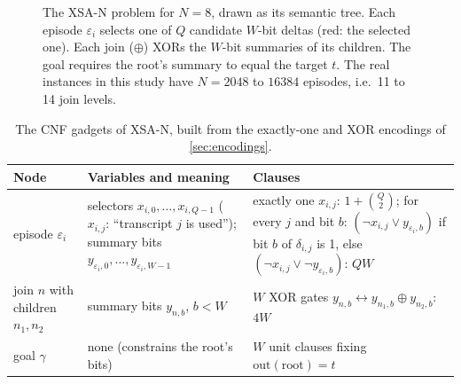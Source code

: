 \documentclass[11pt,a4paper]{article}
\newcommand{\XSA}{\textsf{XSA-N}}
\newcommand{\outb}{\mathrm{out}}
\begin{document}
\begin{figure}[htbp]
\centering
{}
\caption{The \XSA{} problem for $N=8$, drawn as its semantic tree. Each episode $\varepsilon_i$
selects one of $Q$ candidate $W$-bit deltas (red: the selected one). Each join ($\oplus$)
XORs the $W$-bit summaries of its children. The goal requires the root's summary to equal
the target $t$. The real instances in this study have $N=2048$ to $16384$ episodes, i.e.\
11 to 14 join levels.}
\label{fig:xsa}
\end{figure}

\begin{table}[htbp]
\centering\small
\begin{tabular}{@{}p{}p{}p{}@{}}
\toprule
Node & Variables and meaning & Clauses \\
\midrule
episode $\varepsilon_i$ & selectors $x_{i,0},\dots,x_{i,Q-1}$ ($x_{i,j}$: ``transcript $j$ is used'');
  summary bits $y_{\varepsilon_i,0},\dots,y_{\varepsilon_i,W-1}$ &
  exactly one $x_{i,j}$: $1+\binom{Q}{2}$; for every $j$ and bit $b$: $(\neg x_{i,j}\lor y_{\varepsilon_i,b})$ if bit $b$ of $\delta_{i,j}$ is 1, else $(\neg x_{i,j}\lor\neg y_{\varepsilon_i,b})$: $QW$ \\
join $n$ with children $n_1,n_2$ & summary bits $y_{n,b}$, $b<W$ &
  $W$ XOR gates $y_{n,b}\leftrightarrow y_{n_1,b}\oplus y_{n_2,b}$: $4W$ \\
goal $\gamma$ & none (constrains the root's bits) & $W$ unit clauses fixing $\outb(\text{root})=t$ \\
\bottomrule
\end{tabular}
\caption{The CNF gadgets of \XSA{}, built from the exactly-one and XOR encodings of
\cref{sec:encodings}.}
\label{tab:gadgets}
\end{table}
\end{document}
